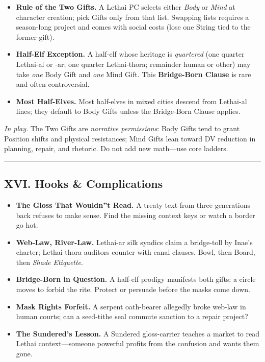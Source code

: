 \documentclass[11pt]{article}
\begin{document}
\begin{itemize}[leftmargin=*]
  \item \textbf{Rule of the Two Gifts.} A Lethai PC selects either \emph{Body} or \emph{Mind} at character creation; pick Gifts only from that list. Swapping lists requires a season-long project and comes with social costs (lose one String tied to the former gift).
  \item \textbf{Half-Elf Exception.} A half-elf whose heritage is \emph{quartered} (one quarter Lethai-al or -ar; one quarter Lethai-thora; remainder human or other) may take \emph{one} Body Gift and \emph{one} Mind Gift. This \textbf{Bridge-Born Clause} is rare and often controversial.
  \item \textbf{Most Half-Elves.} Most half-elves in mixed cities descend from Lethai-al lines; they default to Body Gifts unless the Bridge-Born Clause applies.
\end{itemize}

\textit{In play.} The Two Gifts are \emph{narrative permissions}: Body Gifts tend to grant Position shifts and physical resistances; Mind Gifts lean toward DV reduction in planning, repair, and rhetoric. Do not add new math---use core ladders.

\medskip\hrule\medskip

\subsection{XVI. Hooks \& Complications}

\begin{itemize}[leftmargin=*]
  \item \textbf{The Gloss That Wouldn''t Read.} A treaty text from three generations back refuses to make sense. Find the missing context keys or watch a border go hot.
  \item \textbf{Web-Law, River-Law.} Lethai-ar silk syndics claim a bridge-toll by Inae's charter; Lethai-thora auditors counter with canal clauses. Bowl, then Board, then \emph{Shade Etiquette}.
  \item \textbf{Bridge-Born in Question.} A half-elf prodigy manifests both gifts; a circle moves to forbid the rite. Protect or persuade before the masks come down.
  \item \textbf{Mask Rights Forfeit.} A serpent oath-bearer allegedly broke web-law in human courts; can a seed-tithe seal commute sanction to a repair project?
  \item \textbf{The Sundered's Lesson.} A Sundered gloss-carrier teaches a market to read Lethai context---someone powerful profits from the confusion and wants them gone.
\end{itemize}
\end{document}
